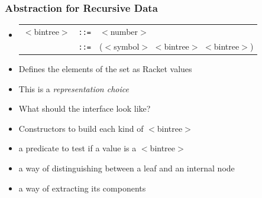 \documentclass{beamer}
\newcommand{\is}{\texttt{::=}}
\begin{document}
\begin{frame}[fragile]
\frametitle{Abstraction for Recursive Data}
\begin{scriptsize}
\begin{itemize}
\item<1->
\begin{tabular}{lll}
   $<$bintree$>$ & \is{} & $<$number$>$ \\
         & \is{} & ($<$symbol$>$ $<$bintree$>$ $<$bintree$>$) \\
\end{tabular}

\item<1-> Defines the elements of the set as Racket values

\item<1-> This is a \emph{representation choice}

\item<2-> What should the interface look like?

\item<2-> Constructors to build each kind of $<$bintree$>$

\item<2-> a predicate to test if a value is a $<$bintree$>$

\item<2-> a way of distinguishing between a leaf and an internal node

\item<2-> a way of extracting its components


\end{itemize}
\end{scriptsize}
\end{frame}
\end{document}
